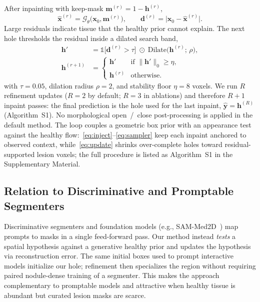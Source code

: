 \documentclass[letterpaper]{article} %
\newcommand{\suppAlgRefine}{Algorithm~S1}
\begin{document}
After inpainting with keep-mask \(\mathbf{m}^{(r)}=1-\mathbf{h}^{(r)}\),
\begin{equation}
\label{eq:residual}
\hat{\mathbf{x}}^{(r)}
=
\mathcal{G}_\theta\!\bigl(\mathbf{x}_0,\mathbf{m}^{(r)}\bigr),
\qquad
\mathbf{d}^{(r)}
=
\bigl|\mathbf{x}_0-\hat{\mathbf{x}}^{(r)}\bigr|.
\end{equation}
Large residuals indicate tissue that the healthy prior cannot explain.
The next hole thresholds the residual inside a dilated search band,
\begin{equation}
\label{eq:update}
\begin{aligned}
\mathbf{h}'
&=
\mathbb{1}\!\bigl[\mathbf{d}^{(r)}>\tau\bigr]
\;\odot\;
\mathrm{Dilate}\!\bigl(\mathbf{h}^{(r)};\,\rho\bigr),
\\
\mathbf{h}^{(r+1)}
&=
\begin{cases}
\mathbf{h}' & \text{if }\|\mathbf{h}'\|_0\ge\eta,\\
\mathbf{h}^{(r)} & \text{otherwise.}
\end{cases}
\end{aligned}
\end{equation}
with \(\tau{=}0.05\), dilation radius \(\rho{=}2\), and stability floor
\(\eta{=}8\) voxels.
We run \(R\) refinement updates (\(R{=}2\) by default; \(R{=}3\) in
ablations) and therefore \(R{+}1\) inpaint passes: the final prediction is
the hole used for the last inpaint, \(\hat{\mathbf{y}}=\mathbf{h}^{(R)}\)
(\suppAlgRefine{}).
No morphological open~/~close post-processing is applied in the default method.
The loop couples a geometric box prior with an appearance test against the
healthy flow:~\eqref{eq:inject}--\eqref{eq:sampler} keep each inpaint
anchored to observed context, while~\eqref{eq:update} shrinks over-complete
holes toward residual-supported lesion voxels; the full procedure is
listed as \suppAlgRefine{} in the Supplementary Material.

\subsection{Relation to Discriminative and Promptable Segmenters}
\label{sec:method:discuss}

Discriminative segmenters and foundation models (e.g.,
SAM-Med2D~\citep{sam_med2d2023}) map prompts to masks in a single feed-forward
pass.
Our method instead \emph{tests} a spatial hypothesis against a generative
healthy prior and updates the hypothesis via reconstruction error.
The same initial boxes used to prompt interactive models initialize our hole;
refinement then specializes the region without requiring paired nodule-dense
training of a segmenter.
This makes the approach complementary to promptable models and attractive when
healthy tissue is abundant but curated lesion masks are scarce.
\end{document}
